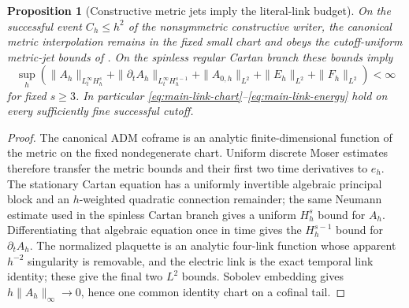 \documentclass[11pt]{article}
\numberwithin{equation}{section}
\newtheorem{proposition}[proposition]{Proposition}
\theoremstyle{definition}
\theoremstyle{remark}
\begin{document}
\begin{proposition}[Constructive metric jets imply the literal-link budget]
\label{prop:supp-same-cylinder-link-budget}
On the successful event $C_h\le h^2$ of the nonsymmetric constructive
writer, the canonical metric interpolation remains in the fixed small chart
and obeys the cutoff-uniform metric-jet bounds of
.  On the spinless regular
Cartan branch these bounds imply
\begin{equation}
 \sup_h\left(
 \|A_h\|_{L_t^\infty H_h^s}
 +\|\partial_tA_h\|_{L_t^\infty H_h^{s-1}}
 +\|A_{0,h}\|_{L^2}+\|E_h\|_{L^2}+\|F_h\|_{L^2}\right)<\infty
 \label{eq:supp-same-cylinder-link-budget}
\end{equation}
for fixed $s\ge3$.  In particular
\eqref{eq:main-link-chart}--\eqref{eq:main-link-energy} hold on every
sufficiently fine successful cutoff.
\end{proposition}
\begin{proof}
The canonical ADM coframe is an analytic finite-dimensional function of the
metric on the fixed nondegenerate chart.  Uniform discrete Moser estimates
therefore transfer the metric bounds and their first two time derivatives to
$e_h$.  The stationary Cartan equation has a uniformly invertible algebraic
principal block and an $h$-weighted quadratic connection remainder; the same
Neumann estimate used in the spinless Cartan branch gives a uniform
$H_h^s$ bound for $A_h$.  Differentiating that algebraic equation once in
time gives the $H_h^{s-1}$ bound for $\partial_tA_h$.  The normalized
plaquette is an analytic four-link function whose apparent $h^{-2}$
singularity is removable, and the electric link is the exact temporal link
identity; these give the final two $L^2$ bounds.  Sobolev embedding gives
$h\|A_h\|_\infty\to0$, hence one common identity chart on a cofinal tail.
\end{proof}
\end{document}
